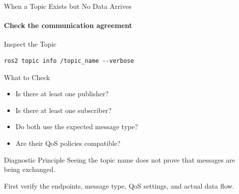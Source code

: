 \begin{frame}[fragile]{When a Topic Exists but No Data Arrives}
\framesubtitle{Check the communication agreement}

\footnotesize

\begin{block}{Inspect the Topic}
\begin{verbatim}
ros2 topic info /topic_name --verbose
\end{verbatim}
\end{block}

\begin{exampleblock}{What to Check}
    \begin{itemize}
        \setlength{\itemsep}{0.22em}
        \item Is there at least one publisher?
        \item Is there at least one subscriber?
        \item Do both use the expected message type?
        \item Are their QoS policies compatible?
    \end{itemize}
\end{exampleblock}

\begin{alertblock}{Diagnostic Principle}
    Seeing the topic name does not prove that messages are being exchanged.

    First verify the endpoints, message type, QoS settings,
    and actual data flow.
\end{alertblock}

\end{frame}





